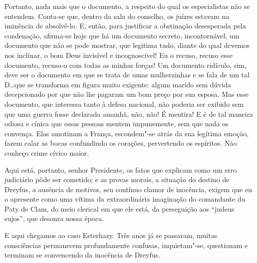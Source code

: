  Portanto, nada mais que o documento, a respeito do qual os
especialistas não se entendem. Conta-se que, dentro da sala do
conselho, os juízes estavam na iminência de absolvê-lo. E, então,
para justificar a obstinação desesperada pela condenação, afirma-se
hoje que há um documento secreto, incontornável, um documento que não
se pode mostrar, que legitima tudo, diante do qual devemos nos
inclinar, o bom Deus invisível e incognoscível! Eu o recuso, recuso
esse documento, recuso-o com todas as minhas forças! Um documento
ridículo, sim, deve ser o documento em que se trata de umas mulherzinhas 
e se fala de um tal D\ldots que se transforma em figura
muito exigente: algum marido sem dúvida decepcionado por que não lhe
pagaram um bom preço por sua esposa. Mas esse documento, que interessa tanto à
defesa nacional, não poderia ser exibido sem que uma guerra fosse declarada amanhã, não, não! 
É mentira! E é de tal maneira odiosa e
cínica que essas pessoas mentem impunemente, sem que nada os convença.
Elas amotinam a França, escondem"-se atrás da sua legítima emoção,
fazem calar as bocas confundindo os corações, pervertendo os espíritos.
Não conheço crime cívico maior.

 Aqui está, portanto, senhor Presidente, os fatos que explicam como um
erro judiciário pôde ser cometido; e as provas morais, a situação do
destino de Dreyfus, a ausência de motivos, seu contínuo clamor de
inocência, exigem que eu o apresente como uma vítima da extraordinária
imaginação do comandante du Paty de Clam, do meio clerical em que ele
está, da perseguição aos “judeus sujos”, que desonra nossa época.

 E aqui chegamos ao caso Esterhazy. Três anos já se passaram, muitas
consciências permanecem profundamente confusas, inquietam"-se,
questionam e terminam se convencendo da inocência de Dreyfus.

